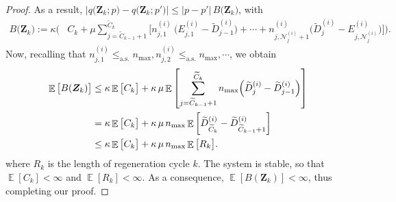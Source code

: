 \documentclass[11pt]{article}
\theoremstyle{remark}
\theoremstyle{definition}
\DeclareMathOperator{\exptn}{\mathbb{E}}
\newcommand{\bs}[1]{{\boldsymbol #1 }}
\numberwithin{equation}{section}
\begin{document}
\begin{proof}
    As a result, $\big\vert q\big(\bs{Z}_k;p\big) - q\big(\bs{Z}_k;p'\big) \big\vert \leq\big\vert p - p'\big\vert\,B\big(\bs{Z}_k\big)$, with 
    \begin{align}
       B\big(\bs{Z}_k\big):=\kappa \Bigg(&C_k + \mu \sum_{j = \widetilde{C}_{k-1}+1}^{\widetilde{C}_k} \Bigg[ n^{(i)}_{j,1} \ \Big(E^{(i)}_{j,1} - \widetilde{D}^{(i)}_{j-1}\Big) + \cdots + n^{(i)}_{j, {\mathscr N}^{(i)}_{j}+1} \bigg(\widetilde{D}^{(i)}_{j} - E^{(i)}_{j,{\mathscr N}^{(i)}_{j}}\bigg) \Bigg] \Bigg).
    \end{align}
    Now, recalling that $n^{(i)}_{j,1} \le_{\text{a.s.}} n_{\max}, n^{(i)}_{j,2} \le_{\text{a.s.}} n_{\max}, \cdots$, we obtain 
    \begin{align}
        \exptn \big[B(\bs{Z}_k)\big] &\leq \kappa\exptn\big[C_k\big] + \kappa\,\mu \exptn\left[ \sum_{j=\widetilde C_{k-1}+1}^{\widetilde C_k} n_{\max}\Big(\widetilde D^{(i)}_{j}-\widetilde D^{(i)}_{j-1}\Big) \right] \notag
        \\
        &= \kappa\exptn\big[C_k\big] + \kappa\,\mu\, n_{\max} \exptn\left[ \widetilde D^{(i)}_{\widetilde C_k} - \widetilde D^{(i)}_{\widetilde C_{k-1}+1} \right] \notag
        \\
        &\leq \kappa\exptn\big[C_k\big] + \kappa\,\mu\, n_{\max} \exptn\big[R_k\big].
    \end{align}
    where $R_k$ is the length of regeneration cycle $k$.
    The system is stable, so that $\exptn[C_k] < \infty$ and $\exptn[R_k] < \infty$. As a consequence, $\exptn[B(\bs{Z}_k)] < \infty$, thus completing our proof.
\end{proof}
\end{document}
